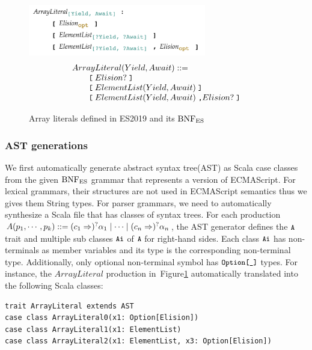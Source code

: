 \begin{figure}
  \centering
  \includegraphics[height=6em]{img/array_literal.png}
  \[
    \begin{array}{l}
      ArrayLiteral(Yield, Await) ::=\\
      \qquad \texttt{\small[} \; Elision? \; \texttt{\small]}\\
      \qquad \texttt{\small[} \; ElementList(Yield, Await) \; \texttt{\small]}\\
      \qquad \texttt{\small[} \; ElementList(Yield, Await) \; \texttt{\small,} Elision? \; \texttt{\small]}\\
    \end{array}
  \]
  \caption{Array literals defined in ES2019 and its \( \text{BNF}_{\text{ES}} \)}
  \label{fig:array-literal}
\end{figure}

\subsubsection{AST generations}
We first automatically generate abstract syntax tree(AST) as Scala case classes
from the given \( \text{BNF}_{\text{ES}} \) grammar that represents a version of ECMAScript.
For lexical grammars, their structures are not used in ECMAScript semantics
thus we gives them String types. For parser grammars, we need to
automatically synthesize a Scala file that has classes of syntax trees.
For each production \(
  A(p_1, \cdots, p_k) ::=
  (c_1 \Rightarrow)^? \alpha_1 \mid
  \cdots \mid
  (c_n \Rightarrow)^? \alpha_n
\), the AST generator defines the \( \texttt{\small A} \) trait and
multiple sub classes \( \texttt{\small Ai} \) of \( \texttt{\small A} \) for right-hand sides.
Each class \( \texttt{\small Ai} \) has non-terminals as member variables and
its type is the corresponding non-terminal type. Additionally, only optional
non-terminal symbol has \( \texttt{\small Option[\_]} \) types.
For instance, the \( ArrayLiteral \) production
in~Figure\ref{fig:array-literal} automatically translated into the following
Scala classes:
\begin{lstlisting}[style=myScalastyle]
trait ArrayLiteral extends AST
case class ArrayLiteral0(x1: Option[Elision])
case class ArrayLiteral1(x1: ElementList)
case class ArrayLiteral2(x1: ElementList, x3: Option[Elision])
\end{lstlisting}

